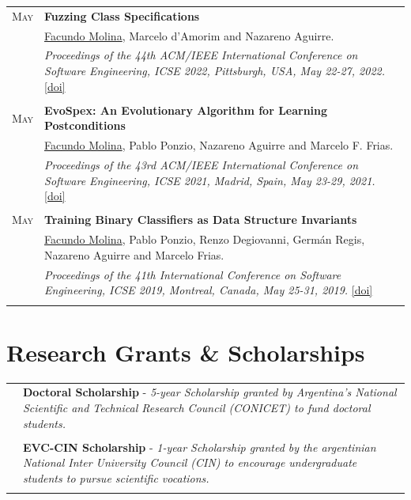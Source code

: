 \documentclass[a4paper,10pt]{article} %
\begin{document}
\begin{longtable}{>{\raggedleft\arraybackslash}p{} p{}}
\textsc{May}  & \textbf{Fuzzing Class Specifications} \\
	2022 & \underline{Facundo Molina}, Marcelo d'Amorim and Nazareno Aguirre. \\
	& \textit{Proceedings of the 44th ACM/IEEE International Conference on Software Engineering, ICSE 2022, Pittsburgh, USA, May 22-27, 2022.} \href{https://dl.acm.org/doi/abs/10.1145/3510003.3510120}{[doi]}\\ & \\

\textsc{May}  & \textbf{EvoSpex: An Evolutionary Algorithm for Learning Postconditions} \\
2021 & \underline{Facundo Molina}, Pablo Ponzio, Nazareno Aguirre and Marcelo F. Frias. \\
& \textit{Proceedings of the 43rd ACM/IEEE International Conference on Software Engineering, ICSE 2021, Madrid, Spain, May 23-29, 2021.} \href{https://doi.ieeecomputersociety.org/10.1109/ICSE43902.2021.00112}{[doi]} \\ & \\


\textsc{May}  & \textbf{Training Binary Classifiers as Data Structure Invariants} \\ 
2019 & \underline{Facundo Molina}, Pablo Ponzio, Renzo Degiovanni, Germán Regis, Nazareno Aguirre and Marcelo Frias. \\
& \textit{Proceedings of the 41th International Conference on Software Engineering, ICSE 2019, Montreal, Canada, May 25-31, 2019.} \href{https://doi.ieeecomputersociety.org/10.1109/ICSE.2019.00084}{[doi]} \\ & \\

\end{longtable}

\section{Research Grants \& Scholarships}
\begin{longtable}{>{\raggedleft\arraybackslash}p{} p{}}

2017 & \textbf{Doctoral Scholarship} - \textit{5-year Scholarship granted by Argentina's National Scientific and Technical Research Council (CONICET) to fund doctoral students.} \\ & \\

2016 & \textbf{EVC-CIN Scholarship} - \textit{1-year Scholarship granted by the argentinian National Inter University Council (CIN) to encourage undergraduate students to pursue scientific vocations.} \\ & \\

\end{longtable}
\end{document}
